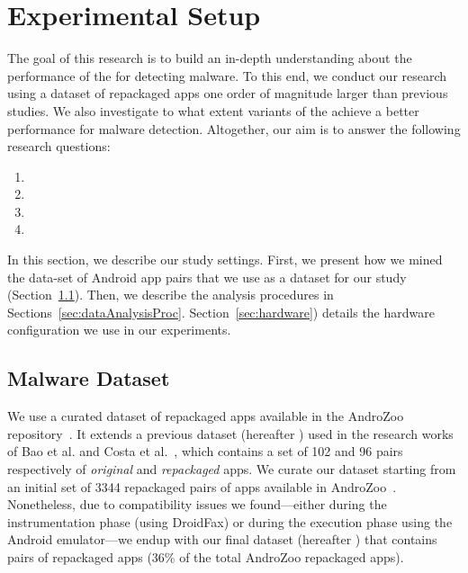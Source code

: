 \section{Experimental Setup}\label{sec:experimentalSetup}

The goal of this research is to build an in-depth understanding about
the performance of the \mas for detecting malware. To this
end, we conduct our research using a dataset of repackaged apps one order of magnitude
larger than previous studies. We also investigate to what
extent variants of the \mas achieve a better performance
for malware detection. Altogether, our
aim is to answer the following research questions:

\begin{enumerate}[(RQ1)]
\item \rqa
\item \rqb
\item \rqc
\item \rqd  
\end{enumerate}

In this section, we describe our study settings. First, we present how we mined the data-set of Android app pairs that we
use as a dataset for our study (Section~\ref{sec:dataset}).  Then, we describe the analysis procedures in Sections~\ref{sec:dataAnalysisProc}. Section~\ref{sec:hardware}) details the hardware configuration we use in our
experiments.


\subsection{Malware Dataset}\label{sec:dataset}

We use a curated dataset of \apps repackaged apps available in the AndroZoo repository~\cite{DBLP:conf/msr/AllixBKT16}.
It extends a previous dataset (hereafter \sds) used in the research works of Bao et al. and Costa et al.~\cite{DBLP:conf/wcre/BaoLL18,DBLP:conf/scam/CostaMCMVBC20},
which contains a set of 102 and 96 pairs respectively of \emph{original} and \emph{repackaged} apps.
We curate our dataset starting from an initial set of 3344 repackaged pairs of apps available in AndroZoo~\cite{DBLP:conf/msr/AllixBKT16}.
Nonetheless, due to compatibility issues we found---either during the instrumentation phase (using DroidFax) or during the execution
phase using the Android emulator---we endup with our final dataset (hereafter \cds) that contains \apps pairs of
repackaged apps (36\% of the total AndroZoo repackaged apps). 

